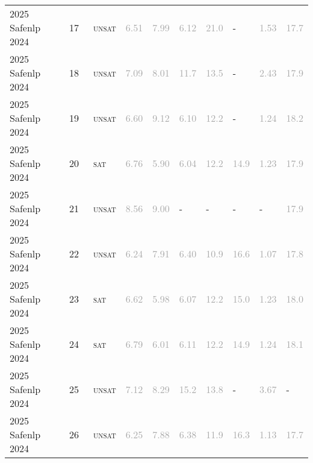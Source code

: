 \begin{center}
{\begin{longtable}{@{}llllllllll@{}}
2025 Safenlp 2024 & 17 & ~\textsc{unsat} & \textcolor{darkgray}{6.51} & \textcolor{darkgray}{7.99} & \textcolor{darkgray}{6.12} & \textcolor{darkgray}{21.0} & - & \textcolor{darkgray}{1.53} & \textcolor{darkgray}{17.7} \\
2025 Safenlp 2024 & 18 & ~\textsc{unsat} & \textcolor{darkgray}{7.09} & \textcolor{darkgray}{8.01} & \textcolor{darkgray}{11.7} & \textcolor{darkgray}{13.5} & - & \textcolor{darkgray}{2.43} & \textcolor{darkgray}{17.9} \\
2025 Safenlp 2024 & 19 & ~\textsc{unsat} & \textcolor{darkgray}{6.60} & \textcolor{darkgray}{9.12} & \textcolor{darkgray}{6.10} & \textcolor{darkgray}{12.2} & - & \textcolor{darkgray}{1.24} & \textcolor{darkgray}{18.2} \\
2025 Safenlp 2024 & 20 & ~\textsc{sat} & \textcolor{darkgray}{6.76} & \textcolor{darkgray}{5.90} & \textcolor{darkgray}{6.04} & \textcolor{darkgray}{12.2} & \textcolor{darkgray}{14.9} & \textcolor{darkgray}{1.23} & \textcolor{darkgray}{17.9} \\
2025 Safenlp 2024 & 21 & ~\textsc{unsat} & \textcolor{darkgray}{8.56} & \textcolor{darkgray}{9.00} & - & - & - & - & \textcolor{darkgray}{17.9} \\
2025 Safenlp 2024 & 22 & ~\textsc{unsat} & \textcolor{darkgray}{6.24} & \textcolor{darkgray}{7.91} & \textcolor{darkgray}{6.40} & \textcolor{darkgray}{10.9} & \textcolor{darkgray}{16.6} & \textcolor{darkgray}{1.07} & \textcolor{darkgray}{17.8} \\
2025 Safenlp 2024 & 23 & ~\textsc{sat} & \textcolor{darkgray}{6.62} & \textcolor{darkgray}{5.98} & \textcolor{darkgray}{6.07} & \textcolor{darkgray}{12.2} & \textcolor{darkgray}{15.0} & \textcolor{darkgray}{1.23} & \textcolor{darkgray}{18.0} \\
2025 Safenlp 2024 & 24 & ~\textsc{sat} & \textcolor{darkgray}{6.79} & \textcolor{darkgray}{6.01} & \textcolor{darkgray}{6.11} & \textcolor{darkgray}{12.2} & \textcolor{darkgray}{14.9} & \textcolor{darkgray}{1.24} & \textcolor{darkgray}{18.1} \\
2025 Safenlp 2024 & 25 & ~\textsc{unsat} & \textcolor{darkgray}{7.12} & \textcolor{darkgray}{8.29} & \textcolor{darkgray}{15.2} & \textcolor{darkgray}{13.8} & - & \textcolor{darkgray}{3.67} & - \\
2025 Safenlp 2024 & 26 & ~\textsc{unsat} & \textcolor{darkgray}{6.25} & \textcolor{darkgray}{7.88} & \textcolor{darkgray}{6.38} & \textcolor{darkgray}{11.9} & \textcolor{darkgray}{16.3} & \textcolor{darkgray}{1.13} & \textcolor{darkgray}{17.7} \\

\end{longtable}}
\end{center}
